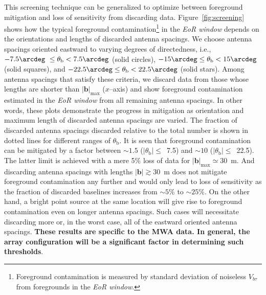 \documentclass[preprint2,iop,numberedappendix]{emulateapj}
\begin{document}
This screening technique can be generalized to optimize between foreground mitigation and loss of sensitivity from discarding data. Figure~\ref{fig:screening} shows how the typical foreground contamination\footnote{Foreground contamination is measured by standard deviation of noiseless $V_{b\tau}$ from foregrounds in the {\it EoR window}.} in the {\it EoR window} depends on the orientations and lengths of discarded antenna spacings. We choose antenna spacings oriented eastward to varying degrees of directedness, i.e., $-7.5\arcdeg~\le\theta_\textrm{b} < 7.5\arcdeg$ (solid circles), $-15\arcdeg\le\theta_\textrm{b}< 15\arcdeg$ (solid squares), and $-22.5\arcdeg\le\theta_\textrm{b}< 22.5\arcdeg$ (solid stars). Among antenna spacings that satisfy these criteria, we discard data from those whose lengths are shorter than $|\boldsymbol{b}|_\textrm{max}$ ($x$--axis) and show foreground contamination estimated in the {\it EoR window} from all remaining antenna spacings. In other words, these plots demonstrate the progress in mitigation as orientation and maximum length of discarded antenna spacings are varied. %
The fraction of discarded antenna spacings discarded relative to the total number is shown in dotted lines for different ranges of $\theta_\textrm{b}$. It is seen that foreground contamination can be mitigated by a factor between $\sim 1.5$ ($|\theta_\textrm{b}|\le$~7.5\arcdeg) and $\sim 10$ ($|\theta_\textrm{b}|\le$~22.5\arcdeg). The latter limit is achieved with a mere 5\% loss of data for $|\boldsymbol{b}|_\textrm{max}\simeq30$~m. And discarding antenna spacings with lengths $|\boldsymbol{b}|\gtrsim 30$~m does not mitigate foreground contamination any further and would only lead to loss of sensitivity as the fraction of discarded baselines increases from $\sim 5$\% to $\sim 25$\%. On the other hand, a bright point source at the same location will give rise to foreground contamination even on longer antenna spacings. Such cases will necessitate discarding more or, in the worst case, all of the eastward oriented antenna spacings. {\bf These results are specific to the MWA data. In general, the array configuration will be a significant factor in determining such thresholds}.
\end{document}
